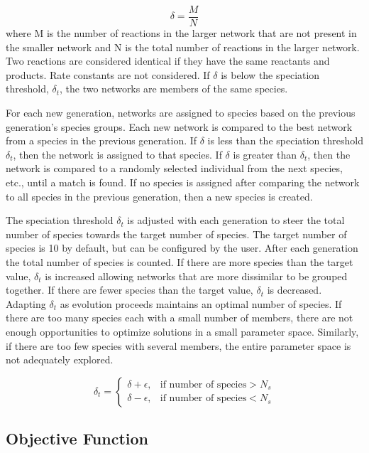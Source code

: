 \documentclass[12pt]{report}
\begin{document}
\begin{equation}
\delta=\frac{M}{N}
\end{equation}
where M is the number of reactions in the larger network that are not present in the smaller network and N is the total number of reactions in the larger network. Two reactions are considered identical if they have the same reactants and products. Rate constants are not considered. If $\delta$ is below the speciation threshold, $\delta_{t}$, the two networks are members of the same species.

For each new generation, networks are assigned to species based on the previous generation's species groups. Each new network is compared to the best network from a species in the previous generation. If $\delta$ is less than the speciation threshold $\delta_{t}$, then the network is assigned to that species. If $\delta$ is greater than $\delta_{t}$, then the network is compared to a randomly selected individual from the next species, etc., until a match is found. If no species is assigned after comparing the network to all species in the previous generation, then a new species is created. 

The speciation threshold $\delta_{t}$ is adjusted with each generation to steer the total number of species towards the target number of species. The target number of species is 10 by default, but can be configured by the user. After each generation the total number of species is counted. If there are more species than the target value, $\delta_{t}$ is increased allowing networks that are more dissimilar to be grouped together. If there are fewer species than the target value, $\delta_{t}$ is decreased. Adapting $\delta_{t}$ as evolution proceeds maintains an optimal number of species. If there are too many species each with a small number of members, there are not enough opportunities to optimize solutions in a small parameter space. Similarly, if there are too few species with several members, the entire parameter space is not adequately explored. 

\begin{equation}
	\delta_{t} = \begin{cases}\delta+\epsilon,& \mbox{if number of species} > N_{s} \\
	\delta-\epsilon,& \mbox{if number of species} < N_{s}
	\end{cases}
\end{equation}

\subsection{Objective Function}
\end{document}
